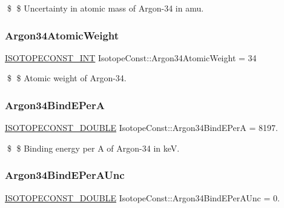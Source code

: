 \$ \$ Uncertainty in atomic mass of Argon-\/34 in amu. \mbox{\label{group___isotope_const-_argon-_ar34_ga5ea89b29a64fc6ef3ee2980fa48815a0}} 
\subsubsection{\texorpdfstring{Argon34\+Atomic\+Weight}{Argon34AtomicWeight}}
{\footnotesize\ttfamily \mbox{\hyperlink{group___isotope_const-_macros_ga5f18360b3e99483a35c32d789e62621c}{I\+S\+O\+T\+O\+P\+E\+C\+O\+N\+S\+T\+\_\+\+I\+NT}} Isotope\+Const\+::\+Argon34\+Atomic\+Weight = 34}

\$ \$ Atomic weight of Argon-\/34. \mbox{\label{group___isotope_const-_argon-_ar34_ga5fa33fff576fa7927b4a98baf07dbffb}} 
\subsubsection{\texorpdfstring{Argon34\+Bind\+E\+PerA}{Argon34BindEPerA}}
{\footnotesize\ttfamily \mbox{\hyperlink{group___isotope_const-_macros_ga8f45a7272ce02c0b4c65c44636ed719a}{I\+S\+O\+T\+O\+P\+E\+C\+O\+N\+S\+T\+\_\+\+D\+O\+U\+B\+LE}} Isotope\+Const\+::\+Argon34\+Bind\+E\+PerA = 8197.}

\$ \$ Binding energy per A of Argon-\/34 in keV. \mbox{\label{group___isotope_const-_argon-_ar34_ga11d0a2fcc36a9775e53b37cf6a6fad6e}} 
\subsubsection{\texorpdfstring{Argon34\+Bind\+E\+Per\+A\+Unc}{Argon34BindEPerAUnc}}
{\footnotesize\ttfamily \mbox{\hyperlink{group___isotope_const-_macros_ga8f45a7272ce02c0b4c65c44636ed719a}{I\+S\+O\+T\+O\+P\+E\+C\+O\+N\+S\+T\+\_\+\+D\+O\+U\+B\+LE}} Isotope\+Const\+::\+Argon34\+Bind\+E\+Per\+A\+Unc = 0.}


